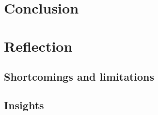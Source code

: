 \documentclass[letterpaper,10pt,english]{sphinxmanual}
\begin{document}
\chapter{Conclusion}
\label{section4::doc}\label{section4:conclusion}

\chapter{Reflection}
\label{section5::doc}\label{section5:reflection}

\section{Shortcomings and limitations}
\label{section5:shortcomings-and-limitations}

\section{Insights}
\label{section5:insights}


\renewcommand{\indexname}{Index}
\printindex
\end{document}
